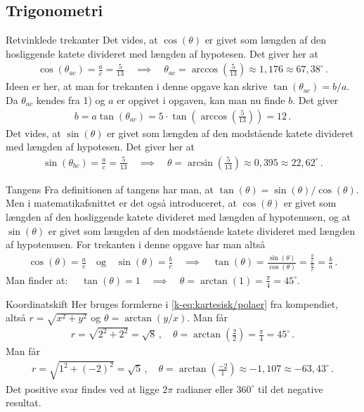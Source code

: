 \subsection*{Trigonometri}
\begin{opgave}[1]{Retvinklede trekanter}
\opg Det vides, at $\cos(\theta)$ er givet som længden af den hosliggende katete divideret med længden af hypotesen. Det giver her at
\begin{align*}
\cos(\theta_{ac}) = \frac{a}{c} = \frac{5}{13} \quad \implies \quad \theta_{ac} = \arccos \left( \frac{5}{13} \right) \approx 1,176  \approx 67,38^\circ \, .
\end{align*}
\opg Ideen er her, at man for trekanten i denne opgave kan skrive $\tan(\theta_{ac}) = b/a$. Da $\theta_{ac}$ kendes fra 1) og $a$ er opgivet i opgaven, kan man nu finde $b$. Det giver
\begin{align*}
b = a \tan(\theta_{ac}) = 5 \cdot \tan \left( \arccos \left( \frac{5}{13}  \right) \right) = 12 \, .
\end{align*}
\opg Det vides, at $\sin(\theta)$ er givet som længden af den modstående katete divideret med længden af hypotesen. Det giver her at
\begin{align*}
\sin(\theta_{bc}) = \frac{a}{c} = \frac{5}{13} \quad \implies \quad \theta = \arcsin \left( \frac{5}{13} \right) \approx 0,395 \approx 22,62 ^\circ \, . 
\end{align*}
\end{opgave}
\begin{opgave}[1]{Tangens}
\opg Fra definitionen af tangens har man, at $\tan(\theta) = \sin(\theta)/\cos(\theta)$. Men i matematikafsnittet er det også introduceret, at $\cos(\theta)$ er givet som længden af den hosliggende katete divideret med længden af hypotenusen, og at $\sin(\theta)$ er givet som længden af den modstående katete divideret med længden af hypotenusen. For trekanten i denne opgave har man altså 
\begin{align*}
\cos(\theta) = \frac{a}{c} \quad \text{og} \quad \sin(\theta) = \frac{b}{c}  \quad \implies  \quad \tan(\theta) = \frac{\sin(\theta)}{\cos(\theta)} = \frac{\frac{b}{c}}{\frac{a}{c}} = \frac{b}{a} \, . 
\end{align*}
\opg Man finder at: $\quad \tan(\theta) = 1 \quad \implies \quad \theta =  \arctan(1) = \frac{\pi}{4} = 45^\circ$.
\end{opgave}
\begin{opgave}[1]{Koordinatskift}
Her bruges formlerne i \eqref{k-eq:kartesisk/polaer} fra kompendiet, altså $r = \sqrt{x^2 + y^2}$ og $\theta = \arctan\left(y/x\right)$.
\opg Man får
\begin{align*}
r = \sqrt{2^2+2^2} = \sqrt{8} \, , \quad \theta = \arctan \left( \frac{2}{2} \right) = \frac{\pi}{4} = 45 ^\circ \, .
\end{align*} 
\opg Man får
\begin{align*}
r = \sqrt{1^2 + (-2)^2} = \sqrt{5} \, , \quad \theta = \arctan \left( \frac{-2}{1} \right) \approx -1,107 \approx -63,43^\circ \, .
\end{align*}
Det positive svar findes ved at ligge $2\pi$ radianer eller $360^\circ$ til det negative resultat.
\end{opgave}
